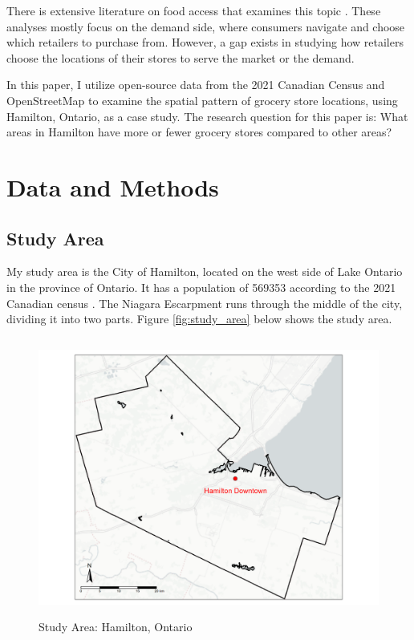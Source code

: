 \documentclass[preprint, 3p,
authoryear]{elsarticle} %
\begin{document}
There is extensive literature on food access that examines this topic
\citep{christian2012using, widener2015spatiotemporal, farber2014temporal, widener2017changes}.
These analyses mostly focus on the demand side, where consumers navigate
and choose which retailers to purchase from. However, a gap exists in
studying how retailers choose the locations of their stores to serve the
market or the demand.

In this paper, I utilize open-source data from the 2021 Canadian Census
\citep{census} and OpenStreetMap \citep{osm} to examine the spatial
pattern of grocery store locations, using Hamilton, Ontario, as a case
study. The research question for this paper is: What areas in Hamilton
have more or fewer grocery stores compared to other areas?

\section{Data and Methods}\label{data-and-methods}

\subsection{Study Area}\label{study-area}

My study area is the City of Hamilton, located on the west side of Lake
Ontario in the province of Ontario. It has a population of 569353
according to the 2021 Canadian census \citep{census}. The Niagara
Escarpment runs through the middle of the city, dividing it into two
parts. Figure \ref{fig:study_area} below shows the study area.

\begin{figure}

{\centering \includegraphics[width=4.8in,height=3.6in]{./images/study_area} 

}

\caption{\label{fig:study_area}Study Area: Hamilton, Ontario}\label{fig:unnamed-chunk-6}
\end{figure}
\end{document}
